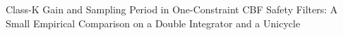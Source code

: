 Class-K Gain and Sampling Period in One-Constraint CBF Safety Filters: A Small Empirical Comparison on a Double Integrator and a Unicycle
